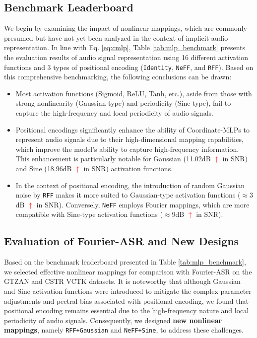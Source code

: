 \documentclass[letterpaper]{article} %
\begin{document}
\subsection{Benchmark Leaderboard}
We begin by examining the impact of nonlinear mappings, which are commonly presumed but have not yet been analyzed in the context of implicit audio representation. In line with Eq. \ref{eq:cmlp}, Table \ref{tab:mlp_benchmark} presents the evaluation results of audio signal representation using 16 different activation functions and 3 types of positional encoding (\texttt{Identity}, \texttt{NeFF}, and \texttt{RFF}). Based on this comprehensive benchmarking, the following conclusions can be drawn:
\begin{itemize}
    \item Most activation functions (Sigmoid, ReLU, Tanh, etc.), aside from those with strong nonlinearity (Gaussian-type) and periodicity (Sine-type), fail to capture the high-frequency and local periodicity of audio signals.
    \item Positional encodings significantly enhance the ability of Coordinate-MLPs to represent audio signals due to their high-dimensional mapping capabilities, which improve the model's ability to capture high-frequency information. This enhancement is particularly notable for Gaussian (11.02dB \textcolor{red}{$\uparrow$} in SNR) and Sine (18.96dB \textcolor{red}{$\uparrow$} in SNR) activation functions.
    \item In the context of positional encoding, the introduction of random Gaussian noise by \texttt{RFF} makes it more suited to Gaussian-type activation functions ($\approx 3$dB \textcolor{red}{$\uparrow$} in SNR). Conversely, \texttt{NeFF} employs Fourier mappings, which are more compatible with Sine-type activation functions ($\approx9$dB \textcolor{red}{$\uparrow$} in SNR).
\end{itemize}

\subsection{Evaluation of Fourier-ASR and New Designs}
Based on the benchmark leaderboard presented in Table \ref{tab:mlp_benchmark}, we selected effective nonlinear mappings for comparison with Fourier-ASR on the GTZAN \cite{tzanetakis2001gtzan} and CSTR VCTK \cite{yamagishi2019cstr} datasets. It is noteworthy that although Gaussian \cite{ramasinghe2022activations} and Sine \cite{sitzmann2020siren} activation functions were introduced to mitigate the complex parameter adjustments and pectral bias associated with positional encoding, we found that positional encoding remains essential due to the high-frequency nature and local periodicity of audio signals. Consequently, we designed \textbf{new nonlinear mappings}, namely \texttt{RFF+Gaussian} and \texttt{NeFF+Sine}, to address these challenges.
\end{document}
